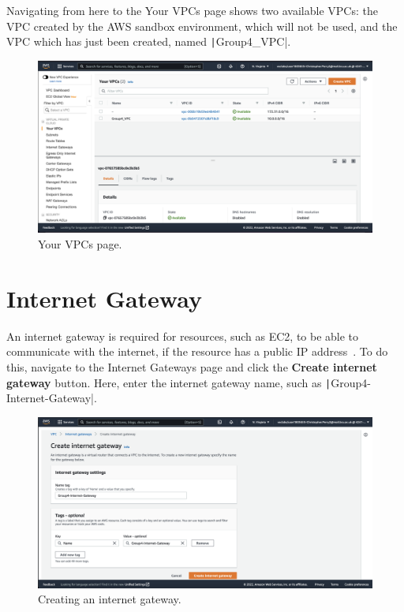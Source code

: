 Navigating from here to the Your VPCs page shows two available VPCs: the VPC created by the AWS sandbox
environment, which will not be used, and the VPC which has just been created, named \texttt|Group4_VPC|.

\begin{figure}[!htbp]
    \centering
    \includegraphics[width=\textwidth]{resources/vpc/your_vpcs}
    \caption{Your VPCs page.}
    \label{fig:vpc-step-5}
\end{figure}

\clearpage
\section{Internet Gateway}\label{sec:internet-gateway}

An internet gateway is required for resources, such as EC2, to be able to communicate with the internet, if the resource
has a public IP address~\parencite{amazon2022connect}.
To do this, navigate to the Internet Gateways page and click the \textbf{Create internet gateway} button.
Here, enter the internet gateway name, such as \texttt|Group4-Internet-Gateway|.

\begin{figure}[!htbp]
    \centering
    \includegraphics[width=\textwidth]{resources/vpc/internet-gateway-1}
    \caption{Creating an internet gateway.}
    \label{fig:internet-gateway-1}
\end{figure}

